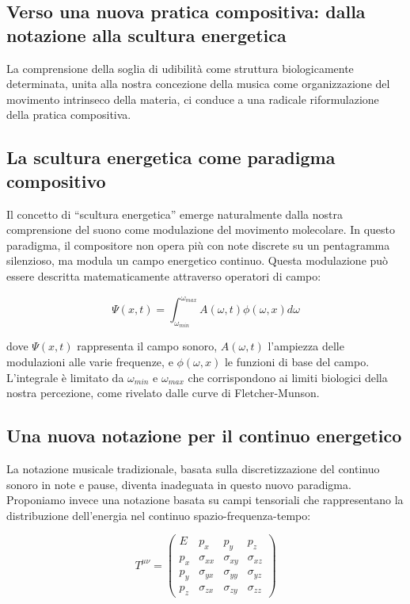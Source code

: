 \documentclass[a4paper,11pt]{article}
\begin{document}
\subsection{Verso una nuova pratica compositiva: dalla notazione alla
scultura
energetica}\label{verso-una-nuova-pratica-compositiva-dalla-notazione-alla-scultura-energetica}

La comprensione della soglia di udibilità come struttura biologicamente
determinata, unita alla nostra concezione della musica come
organizzazione del movimento intrinseco della materia, ci conduce a una
radicale riformulazione della pratica compositiva.

\subsection{La scultura energetica come paradigma
compositivo}\label{la-scultura-energetica-come-paradigma-compositivo}

Il concetto di ``scultura energetica'' emerge naturalmente dalla nostra
comprensione del suono come modulazione del movimento molecolare. In
questo paradigma, il compositore non opera più con note discrete su un
pentagramma silenzioso, ma modula un campo energetico continuo. Questa
modulazione può essere descritta matematicamente attraverso operatori di
campo:

\[\Psi(x,t) = \int_{\omega_{min}}^{\omega_{max}} A(\omega,t)\phi(\omega,x)d\omega\]

dove \(\Psi(x,t)\) rappresenta il campo sonoro, \(A(\omega,t)\)
l'ampiezza delle modulazioni alle varie frequenze, e \(\phi(\omega,x)\)
le funzioni di base del campo. L'integrale è limitato da
\(\omega_{min}\) e \(\omega_{max}\) che corrispondono ai limiti
biologici della nostra percezione, come rivelato dalle curve di
Fletcher-Munson.

\subsection{Una nuova notazione per il continuo
energetico}\label{una-nuova-notazione-per-il-continuo-energetico}

La notazione musicale tradizionale, basata sulla discretizzazione del
continuo sonoro in note e pause, diventa inadeguata in questo nuovo
paradigma. Proponiamo invece una notazione basata su campi tensoriali
che rappresentano la distribuzione dell'energia nel continuo
spazio-frequenza-tempo:

\[T^{\mu\nu} = \begin{pmatrix}
E & p_x & p_y & p_z \\
p_x & \sigma_{xx} & \sigma_{xy} & \sigma_{xz} \\
p_y & \sigma_{yx} & \sigma_{yy} & \sigma_{yz} \\
p_z & \sigma_{zx} & \sigma_{zy} & \sigma_{zz}
\end{pmatrix}\]
\end{document}
